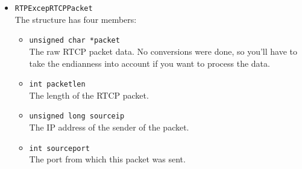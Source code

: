 \begin{itemize}
\begin{itemize}
	\item {\it Sending application specific data:}\\
		When the handler for sending application specific RTCP data
		has been set, this handler will be called by the library when
		RTCP packets are generated. The library will pass an instance
		of the RTPExcepAppData structure, which the application can
		fill in to specify the data to send. Each time RTCP packets
		are generated, the library will keep calling this handler
		until the RTPExcepAppData member 'validdata' is set to
		'false'. When this is the case, the rest of the structure is
		ignored, so only set it to 'false' when all the application
		specific data has already been sent. The 'prevreturnval'
		indicates if there was an error with the previous data.
		The library sets default values for several members:
		\begin{tabbing}
		0123456701234567\=0123456701234567\kill
			subtype \\
			src \> own SSRC\\
			name \> four spaces\\
			data \> NULL\\
			numwords \\
			validdata \> false\\
		\end{tabbing}
		The members should be supplied in host byte order, the library
		will do the necessary conversions. However, the data is passed
		exactly as it was received, since the library can't possibly
		know how to interpret that data.
	\end{itemize}
\item {\tt RTPExcepRTCPPacket}\\
 	The structure has four members:
		\begin{itemize}
		\item {\tt unsigned char *packet}\\
			The raw RTCP packet data. No conversions were done, so
			you'll have to take the endianness into account if you
			want to process the data.
		\item {\tt int packetlen}\\
			The length of the RTCP packet.
		\item {\tt unsigned long sourceip}\\
			The IP address of the sender of the packet.
		\item {\tt int sourceport}\\
			The port from which this packet was sent.
		\end{itemize}

\end{itemize}


